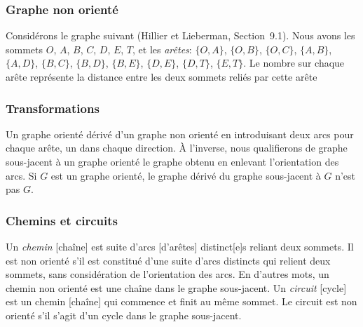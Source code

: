 \documentclass[usepdftitle=false, aspectratio=169]{beamer}
\begin{document}
\begin{frame}[fragile]
\frametitle{Graphe non orienté}

Considérons le graphe suivant (Hillier et Lieberman, Section~9.1).
Nous avons les sommets $O$, $A$, $B$, $C$, $D$, $E$, $T$, et les {\sl arêtes}: $\lbrace O,A \rbrace$, $\lbrace O,B \rbrace$, $\lbrace O,C \rbrace$, $\lbrace A,B \rbrace$, $\lbrace A,D \rbrace$, $\lbrace B,C \rbrace$,
$\lbrace B,D \rbrace$, $\lbrace B,E \rbrace$, $\lbrace D,E \rbrace$, $\lbrace D,T \rbrace$, $\lbrace E,T \rbrace$.
Le nombre sur chaque arête représente la distance entre les deux sommets reliés par cette arête

\begin{center}
\end{center}

\end{frame}

\begin{frame}[fragile]
\frametitle{Transformations}

Un graphe orienté dérivé d'un graphe non orienté en introduisant deux arcs pour chaque arête, un dans chaque direction.
\`A l'inverse, nous qualifierons de graphe sous-jacent à un graphe orienté le graphe obtenu en enlevant l'orientation des arcs.
Si $G$ est un graphe orienté, le graphe dérivé du graphe sous-jacent à $G$ n'est pas $G$.

\end{frame}

\begin{frame}
\frametitle{Chemins et circuits}

Un {\sl chemin} [chaîne] est suite d'arcs [d'arêtes] distinct[e]s reliant deux sommets.
Il est non orienté s'il est constitué d'une suite d'arcs distincts qui relient deux sommets, sans considération de l'orientation des arcs.
En d'autres mots, un chemin non orienté est une chaîne dans le graphe sous-jacent.
Un {\sl circuit} [cycle] est un chemin [chaîne] qui commence et finit au même sommet.
Le circuit est non orienté s'il s'agit d'un cycle dans le graphe sous-jacent.

\end{frame}
\end{document}
